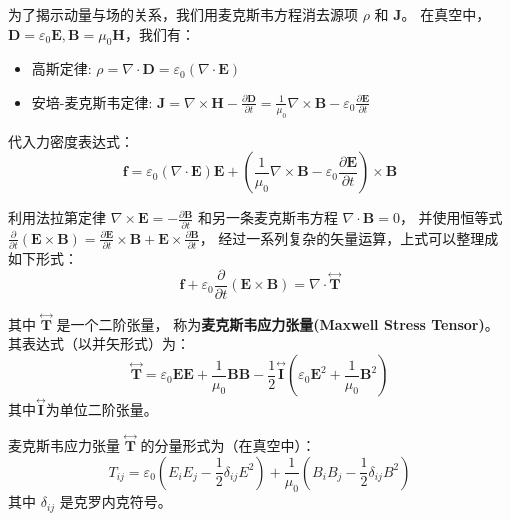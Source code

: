 \documentclass[fontset=none]{ctexart}
\begin{document}
为了揭示动量与场的关系，我们用麦克斯韦方程消去源项 $\rho$ 和 $\bm{J}$。
在真空中，$\bm{D}=\varepsilon_0 \bm{E}, \bm{B}=\mu_0 \bm{H}$，我们有：
\begin{itemize}
    \item 高斯定律: $\rho = \nabla \cdot \bm{D} = \varepsilon_0 (\nabla \cdot \bm{E})$
    \item 安培-麦克斯韦定律: $\bm{J} = \nabla \times \bm{H} 
    - \frac{\partial \bm{D}}{\partial t} = \frac{1}{\mu_0}\nabla \times \bm{B} 
    - \varepsilon_0 \frac{\partial \bm{E}}{\partial t}$
\end{itemize}
代入力密度表达式：
\begin{equation}
    \bm{f} = \varepsilon_0 (\nabla \cdot \bm{E})\bm{E} + \left(\frac{1}{\mu_0}\nabla \times \bm{B} 
    - \varepsilon_0 \frac{\partial \bm{E}}{\partial t}\right) \times \bm{B}
\end{equation}

利用法拉第定律 $\nabla \times \bm{E} = -\frac{\partial \bm{B}}{\partial t}$ 
和另一条麦克斯韦方程 $\nabla \cdot \bm{B} = 0$，
并使用恒等式 $\frac{\partial}{\partial t}(\bm{E} \times \bm{B}) 
= \frac{\partial \bm{E}}{\partial t} \times \bm{B} + \bm{E} \times \frac{\partial \bm{B}}{\partial t}$，
经过一系列复杂的矢量运算，上式可以整理成如下形式：
\begin{equation}
    \bm{f} + \varepsilon_0\frac{\partial}{\partial t}(\bm{E} \times \bm{B}) 
    = \nabla \cdot \overset{\leftrightarrow}{\bm{T}}
\end{equation}

其中 $\overset{\leftrightarrow}{\bm{T}}$ 是一个二阶张量，
称为\textbf{麦克斯韦应力张量(Maxwell Stress Tensor)}。
其表达式（以并矢形式）为：
\begin{equation}
    \overset{\leftrightarrow}{\bm{T}} 
    = \varepsilon_0 \bm{E}\bm{E} + \frac{1}{\mu_0}\bm{B}\bm{B} 
    - \frac{1}{2}\overset{\leftrightarrow}{\bm{I}}(\varepsilon_0 \bm{E}^2 + \frac{1}{\mu_0}\bm{B}^2)
\end{equation}
其中$\overset{\leftrightarrow}{\bm{I}}$为单位二阶张量。

\begin{definition}[麦克斯韦应力张量]
麦克斯韦应力张量 $\overset{\leftrightarrow}{\bm{T}}$ 的分量形式为（在真空中）：
\begin{equation}
    T_{ij} = \varepsilon_0 \left(E_i E_j - \frac{1}{2}\delta_{ij}E^2\right) 
    + \frac{1}{\mu_0}\left(B_i B_j - \frac{1}{2}\delta_{ij}B^2\right)
\end{equation}
其中 $\delta_{ij}$ 是克罗内克符号。
\end{definition}
\end{document}
